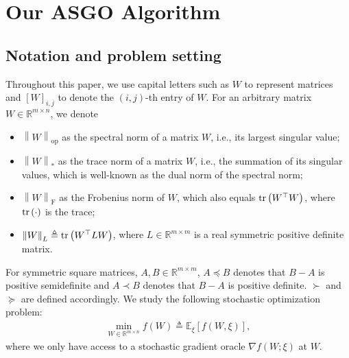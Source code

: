 \documentclass{article}
\theoremstyle{remark}
\newcommand{\Norm}[1]{\left\|#1\right\|}
\newcommand{\tr}[1]{{\rm tr}\left( #1 \right)}
\newcommand{\EE}{\mathbb{E}}
\newcommand{\RR}{\mathbb{R}}
\begin{document}
\section{Our ASGO Algorithm}

\subsection{Notation and problem setting}

Throughout this paper, we use capital letters such as $W$ to represent matrices and $[W]_{i,j}$ to denote the $(i,j)$-th entry of $W$. For an arbitrary matrix $W \in \RR^{m\times n}$, we denote
\begin{itemize}[leftmargin=*]
    \item $\Norm{W}_{\mathrm{op}}$ as the spectral norm of a matrix $W$, i.e., 
    its
    largest singular value;
    \item $\Norm{W}_*$ as the trace norm of a matrix $W$, i.e., the summation of its singular values, which is well-known as the dual norm of the spectral norm;
    \item $\Norm{W}_{\mathrm{F}}$ as the Frobenius norm of $W$, which also equals $\tr{W^\top W}$, where $\tr{\cdot}$ is the trace;
    \item $\Norm{W}_L \triangleq \tr{W^\top L W}$, where $L \in \RR^{m\times m}$ is a real symmetric positive definite matrix.
\end{itemize}
For symmetric square matrices, $A,B \in \RR^{m\times m}$, $A \preceq B$ denotes that $B-A$ is positive semidefinite and $A \prec B$ denotes that $B-A$ is positive definite. $\succ$ and $\succeq$ are defined accordingly. We study the following stochastic optimization problem:
\begin{align}\label{eq:prob_setting}
    \min_{W \in \RR^{m\times n}} f(W) \triangleq \EE_\xi\left[f(W, \xi)\right],
\end{align}
where we only have access to a stochastic gradient oracle $\nabla f(W;\xi)$ at $W$.
\end{document}
